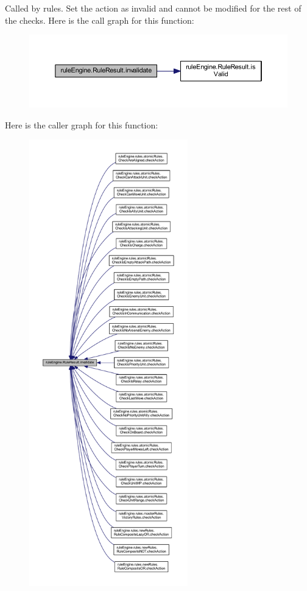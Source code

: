 Called by rules. Set the action as invalid and cannot be modified for the rest of the checks. Here is the call graph for this function\+:
\nopagebreak
\begin{figure}[H]
\begin{center}
\leavevmode
\includegraphics[width=350pt]{classrule_engine_1_1_rule_result_a3257a949d317dfb83ecc2b9cb17ab5fd_cgraph}
\end{center}
\end{figure}
Here is the caller graph for this function\+:
\nopagebreak
\begin{figure}[H]
\begin{center}
\leavevmode
\includegraphics[height=550pt]{classrule_engine_1_1_rule_result_a3257a949d317dfb83ecc2b9cb17ab5fd_icgraph}
\end{center}
\end{figure}
\mbox{\label{classrule_engine_1_1_rule_result_a2cbcc84268db20bd941e6ff3ee648e6e}} 
